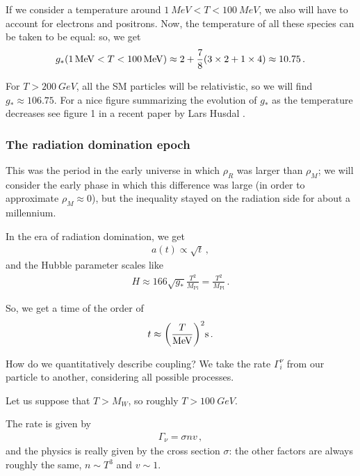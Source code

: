 \documentclass[main.tex]{subfiles}
\begin{document}
If we consider a temperature around \(\SI{1}{MeV} < T < \SI{100}{MeV}\), we also will have to account for electrons and positrons. Now, the temperature of all these species can be taken to be equal: so, we get 
%
\begin{align}
g_{*} (\SI{1}{MeV} < T < \SI{100}{MeV}) \approx 2 + \frac{7}{8} \qty(3 \times 2 + 1 \times 4) \approx \num{10.75}
\,.
\end{align}

For \(T > \SI{200}{GeV}\), all the SM particles will be relativistic, so we will find \(g_* \approx \num{106.75}\). 
For a nice figure summarizing the evolution of \(g_*\) as the temperature decreases see figure 1 in a recent paper by Lars Husdal \cite[]{husdalEffectiveDegreesFreedom2016}.

\subsubsection{The radiation domination epoch}

This was the period in the early universe in which \(\rho_{R} \) was larger than \(\rho_{M}\); we will consider the early phase in which this difference was large (in order to approximate \(\rho_{M} \approx 0\)), but the inequality stayed on the radiation side for about a millennium.

In the era of radiation domination, we get 
%
\begin{align}
a(t) \propto \sqrt{t}
\,,
\end{align}
%
and the Hubble parameter scales like 
%
\begin{align}
H \approx 166 \sqrt{g_{*}} \frac{T^2}{M_{\text{Pl}}} = \frac{T^2}{M _{\text{Pl}}}
\,.
\end{align}

So, we get a time of the order of 
%
\begin{align}
t \approx \qty( \frac{T}{\SI{}{MeV}})^2 \SI{}{s}
\,.
\end{align}

How do we quantitatively describe coupling? We take the rate \(\Gamma_{i}^{\nu }\) from our particle to another, considering all possible processes.

Let us suppose that \(T > M_W\), so roughly \(T > \SI{100}{GeV}\).

The rate is given by 
%
\begin{align}
\Gamma_{\nu } = \sigma n v 
\,,
\end{align}
%
and the physics is really given by the cross section \(\sigma \): the other factors are always roughly the same, \(n \sim T^{3}\) and \(v \sim 1\).
\end{document}
